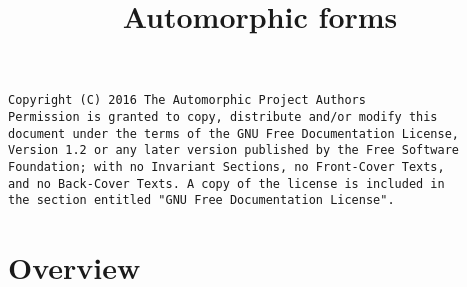 

%

\newcommand{\TAG}{ZZZZ}

\title{Automorphic forms}


\maketitle

\label{section-phantom}
\hypertarget{0400}{}
\reversemarginpar{}

\begin{verbatim}
Copyright (C) 2016 The Automorphic Project Authors
Permission is granted to copy, distribute and/or modify this
document under the terms of the GNU Free Documentation License,
Version 1.2 or any later version published by the Free Software
Foundation; with no Invariant Sections, no Front-Cover Texts,
and no Back-Cover Texts. A copy of the license is included in
the section entitled "GNU Free Documentation License".
\end{verbatim}

\tableofcontents


\section{Overview}
\label{section-overview}
\hypertarget{0401}{}
\reversemarginpar{}










